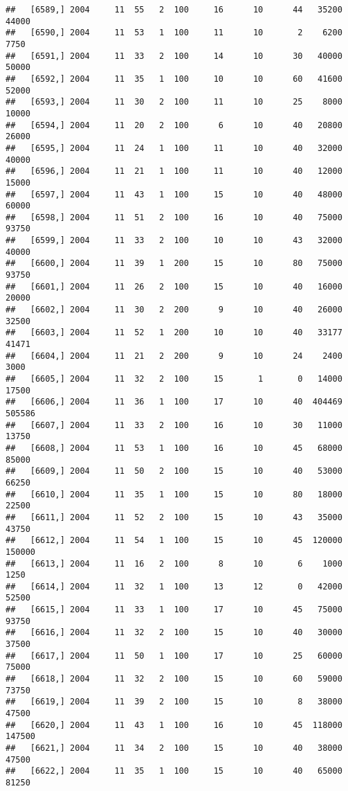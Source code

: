 \documentclass{article}\usepackage[]{graphicx}\usepackage[]{color}
\makeatletter
\newenvironment{kframe}{%
 \def\at@end@of@kframe{}%
 \ifinner\ifhmode%
  \def\at@end@of@kframe{\end{minipage}}%
  \begin{minipage}{\columnwidth}%
 \fi\fi%
 \def\FrameCommand##1{\hskip\@totalleftmargin \hskip-\fboxsep
 \colorbox{shadecolor}{##1}\hskip-\fboxsep
     \hskip-\linewidth \hskip-\@totalleftmargin \hskip\columnwidth}%
 \MakeFramed {\advance\hsize-\width
   \@totalleftmargin\z@ \linewidth\hsize
   \@setminipage}}%
 {\par\unskip\endMakeFramed%
 \at@end@of@kframe}
\newenvironment{knitrout}{}{} %
\makeatother
\begin{document}
\begin{knitrout}
\begin{kframe}
\begin{verbatim}
##   [6589,] 2004     11  55   2  100     16      10      44   35200   44000
##   [6590,] 2004     11  53   1  100     11      10       2    6200    7750
##   [6591,] 2004     11  33   2  100     14      10      30   40000   50000
##   [6592,] 2004     11  35   1  100     10      10      60   41600   52000
##   [6593,] 2004     11  30   2  100     11      10      25    8000   10000
##   [6594,] 2004     11  20   2  100      6      10      40   20800   26000
##   [6595,] 2004     11  24   1  100     11      10      40   32000   40000
##   [6596,] 2004     11  21   1  100     11      10      40   12000   15000
##   [6597,] 2004     11  43   1  100     15      10      40   48000   60000
##   [6598,] 2004     11  51   2  100     16      10      40   75000   93750
##   [6599,] 2004     11  33   2  100     10      10      43   32000   40000
##   [6600,] 2004     11  39   1  200     15      10      80   75000   93750
##   [6601,] 2004     11  26   2  100     15      10      40   16000   20000
##   [6602,] 2004     11  30   2  200      9      10      40   26000   32500
##   [6603,] 2004     11  52   1  200     10      10      40   33177   41471
##   [6604,] 2004     11  21   2  200      9      10      24    2400    3000
##   [6605,] 2004     11  32   2  100     15       1       0   14000   17500
##   [6606,] 2004     11  36   1  100     17      10      40  404469  505586
##   [6607,] 2004     11  33   2  100     16      10      30   11000   13750
##   [6608,] 2004     11  53   1  100     16      10      45   68000   85000
##   [6609,] 2004     11  50   2  100     15      10      40   53000   66250
##   [6610,] 2004     11  35   1  100     15      10      80   18000   22500
##   [6611,] 2004     11  52   2  100     15      10      43   35000   43750
##   [6612,] 2004     11  54   1  100     15      10      45  120000  150000
##   [6613,] 2004     11  16   2  100      8      10       6    1000    1250
##   [6614,] 2004     11  32   1  100     13      12       0   42000   52500
##   [6615,] 2004     11  33   1  100     17      10      45   75000   93750
##   [6616,] 2004     11  32   2  100     15      10      40   30000   37500
##   [6617,] 2004     11  50   1  100     17      10      25   60000   75000
##   [6618,] 2004     11  32   2  100     15      10      60   59000   73750
##   [6619,] 2004     11  39   2  100     15      10       8   38000   47500
##   [6620,] 2004     11  43   1  100     16      10      45  118000  147500
##   [6621,] 2004     11  34   2  100     15      10      40   38000   47500
##   [6622,] 2004     11  35   1  100     15      10      40   65000   81250

\end{verbatim}
\end{kframe}
\end{knitrout}
\end{document}
